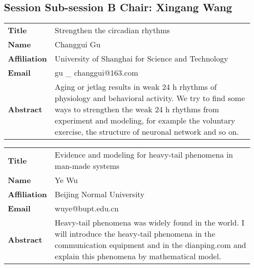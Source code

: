 \documentclass[oneside,A4paper,12pt]{article}
\begin{document}
\subsection*{Session \uppercase\expandafter{} \hspace{10mm} Sub-session B \hspace{10mm} Chair: Xingang Wang}
\label{sec:orgf98b6c3}
\begin{longtable}{p{2cm}p{14cm}}
\toprule
\textbf{Title} & Strengthen the circadian rhythms\\
\textbf{Name} & Changgui Gu\\
\textbf{Affiliation} & University of Shanghai for Science and Technology\\
\textbf{Email} & gu \_ changgui@163.com\\
\textbf{Abstract} & Aging or jetlag results in weak 24 h rhythms of physiology and behavioral activity. We try to find some ways to strengthen the weak 24 h rhythms from experiment and modeling, for example the voluntary exercise, the structure of neuronal network and so on.\\
\bottomrule
\end{longtable}


\newpage
\begin{longtable}{p{2cm}p{14cm}}
\toprule
\textbf{Title} & Evidence and modeling for heavy-tail phenomena in man-made systems\\
\textbf{Name} & Ye Wu\\
\textbf{Affiliation} & Beijing Normal University\\
\textbf{Email} & wuye@bupt.edu.cn\\
\textbf{Abstract} & Heavy-tail phenomena was widely found in the world. I will introduce the heavy-tail phenomena in the communication equipment and in the dianping.com and explain this phenomena by mathematical model.\\
\bottomrule
\end{longtable}
\end{document}
